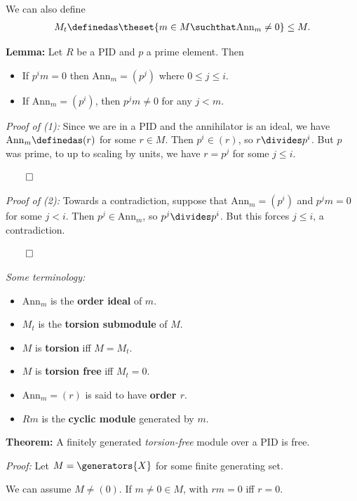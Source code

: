 We can also define
\begin{align*}
M_t \definedas \theset{m\in M \suchthat \mathrm{Ann}_m \neq 0} \leq M.
\end{align*}

\textbf{Lemma:} Let \(R\) be a PID and \(p\) a prime element. Then

\begin{itemize}
\tightlist
\item
  If \(p^i m = 0\) then \(\mathrm{Ann}_m = (p^j)\) where
  \(0\leq j\leq i\).
\item
  If \(\mathrm{Ann}_m = (p^i)\), then \(p^jm \neq 0\) for any \(j < m\).
\end{itemize}

\emph{Proof of (1):} Since we are in a PID and the annihilator is an
ideal, we have \(\mathrm{Ann}_m \definedas (r)\) for some \(r\in M\).
Then \(p^i \in (r)\), so \(r \divides p^i\). But \(p\) was prime, to up
to scaling by units, we have \(r = p^j\) for some \(j \leq i\).

\(\qed\)

\emph{Proof of (2):} Towards a contradiction, suppose that
\(\mathrm{Ann}_m = (p^i)\) and \(p^jm = 0\) for some \(j < i\). Then
\(p^j \in \mathrm{Ann}_m\), so \(p^j \divides p^i\). But this forces
\(j \leq i\), a contradiction.

\(\qed\)

\emph{Some terminology:}

\begin{itemize}
\item
  \(\mathrm{Ann}_m\) is the \textbf{order ideal} of \(m\).
\item
  \(M_t\) is the \textbf{torsion submodule} of \(M\).
\item
  \(M\) is \textbf{torsion} iff \(M = M_t\).
\item
  \(M\) is \textbf{torsion free} iff \(M_t = 0\).
\item
  \(\mathrm{Ann}_m = (r)\) is said to have \textbf{order \(r\)}.
\item
  \(Rm\) is the \textbf{cyclic module} generated by \(m\).
\end{itemize}

\textbf{Theorem:} A finitely generated \emph{torsion-free} module over a
PID is free.

\emph{Proof:} Let \(M = \generators{X}\) for some finite generating set.

We can assume \(M \neq (0)\). If \(m\neq 0 \in M\), with \(rm = 0\) iff
\(r=0\).

